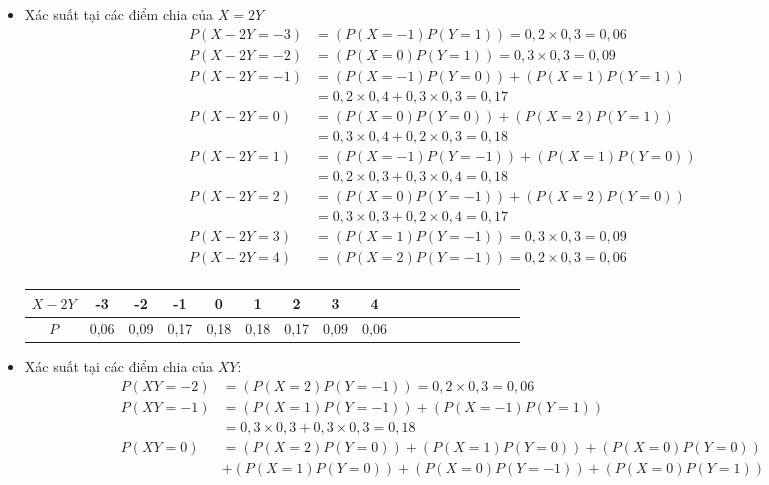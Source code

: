 \documentclass[12pt]{article}
\begin{document}
\begin{itemize}
    \item Xác suất tại các điểm chia của $X=2Y$
    \[
    \begin{aligned}
        P(X - 2Y = -3) &= (P(X = -1)P(Y = 1)) = 0,2 \times 0,3 = 0,06 \\
        P(X - 2Y = -2) &= (P(X = 0)P(Y = 1)) = 0,3 \times 0,3 = 0,09 \\
        P(X - 2Y = -1) &= (P(X = -1)P(Y = 0)) + (P(X = 1)P(Y = 1)) \\
        &= 0,2 \times 0,4 + 0,3 \times 0,3 = 0,17\\
        P(X - 2Y = 0) &= (P(X = 0)P(Y = 0)) + (P(X = 2)P(Y = 1)) \\
        &= 0,3 \times 0,4 + 0,2 \times 0,3 = 0,18\\
        P(X - 2Y = 1) &= (P(X = -1)P(Y = -1)) +(P(X = 1)P(Y = 0)) \\
        &= 0,2 \times 0,3 + 0,3 \times 0,4 = 0,18 \\
        P(X - 2Y = 2) &= (P(X = 0)P(Y = -1)) + (P(X = 2)P(Y = 0)) \\
        &= 0,3 \times 0,3 + 0,2 \times 0,4 = 0,17 \\
        P(X - 2Y = 3) &= (P(X = 1)P(Y = -1)) = 0,3 \times 0,3 = 0,09 \\
        P(X - 2Y = 4) &= (P(X = 2)P(Y = -1)) = 0,2 \times 0,3 = 0,06\\
    \end{aligned}
    \]
    \begin{center}
        \begin{tabular}{|Sc|Sc|Sc|Sc|Sc|Sc|Sc|Sc|Sc|}
        \hline
        $X - 2Y$ & -3 & -2 & -1 & 0 & 1 & 2 & 3 & 4 \\
        \hline
        $P$ & 0,06 & 0,09 & 0,17 & 0,18 & 0,18 & 0,17 & 0,09 & 0,06\\
        \hline        
        \end{tabular}
    \end{center}
    \item Xác suất tại các điểm chia của $XY$:
    \[
    \begin{aligned}
        P(XY = -2) &= (P(X = 2)P(Y = -1)) = 0,2 \times 0,3 = 0,06 \\
        P(XY = -1) &= (P(X = 1)P(Y = -1)) + (P(X = -1)P(Y = 1)) \\
        &= 0,3 \times 0,3 + 0,3 \times 0,3 = 0,18 \\
        P(XY = 0) &= (P(X = 2)P(Y = 0)) + (P(X = 1)P(Y = 0)) + (P(X = 0)P(Y = 0)) \\ &+ (P(X = 1)P(Y = 0)) + (P(X = 0)P(Y = -1)) + (P(X = 0)P(Y = 1))\\

\end{aligned}\]
\end{itemize}
\end{document}
